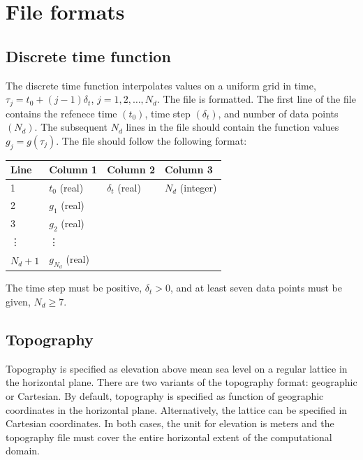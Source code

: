 \documentclass[11pt]{report}
\begin{document}

\chapter{File formats}\label{chap:formats}


\section{Discrete time function}\label{sec:discrete-time-function-format}

The discrete time function interpolates values on a uniform grid in time, $\tau_j = t_0 +
(j-1)\delta_t$, $j=1,2,\ldots,N_d$. The file is formatted. The first line of the file contains the
refenece time $(t_0)$, time step $(\delta_t)$, and number of data points $(N_d)$. The subsequent
$N_d$ lines in the file should contain the function values $g_j = g(\tau_j)$. The file should follow
the following format:
\begin{center}
\begin{tabular}{llll}\hline
Line & Column 1& Column 2& Column 3\\ \hline
1 & $t_0$ (real) & $\delta_t$ (real) & $N_d$ (integer) \\ \hline
2 & $g_1$ (real) & & \\ \hline
3 & $g_2$ (real) & & \\ \hline
\vdots & \vdots & & \\ \hline
$N_d + 1$ & $g_{N_d}$ (real) & & \\ \hline
\end{tabular}
\end{center}
The time step must be positive, $\delta_t>0$, and at least seven data points must be given, $N_d\geq
7$.

\section{Topography}\label{sec:topo-file-format}

Topography is specified as elevation above mean sea level on a regular lattice in the horizontal
plane. There are two variants of the topography format: geographic or Cartesian. By default,
topography is specified as function of geographic coordinates in the horizontal
plane. Alternatively, the lattice can be specified in Cartesian coordinates. In both cases, the unit
for elevation is meters and the topography file must cover the entire horizontal extent of the
computational domain.
\end{document}
